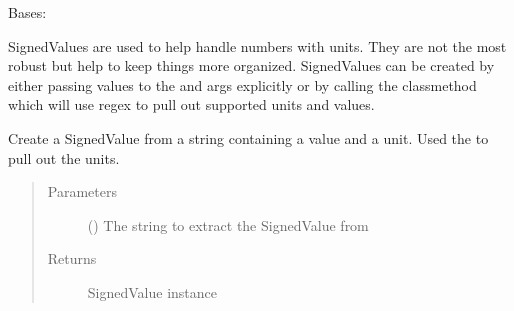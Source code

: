 \documentclass[letterpaper,10pt,english]{sphinxmanual}
\begin{document}
\begin{fulllineitems}
\label{\detokenize{polo.crystallography:polo.crystallography.cocktail.SignedValue}}
Bases: 

SignedValues are used to help handle numbers with units. They
are not the most robust but help to keep things more organized.
SignedValues can be created by either passing values to the
 and  args explicitly or by calling the classmethod
 which will use regex to pull out supported units and
values.

\begin{fulllineitems}
\label{\detokenize{polo.crystallography:polo.crystallography.cocktail.SignedValue.make_from_string}}
Create a SignedValue from a string containing a value and a unit.
Used the  to pull out the units.

\begin{sphinxVerbatim}[commandchars=\\\{\}]
    
  
\end{sphinxVerbatim}
\begin{quote}\begin{description}
\item[{Parameters}] \leavevmode
{} () \textendash{} The string to extract the SignedValue from

\item[{Returns}] \leavevmode
SignedValue instance


\end{description}
\end{quote}
\end{fulllineitems}
\end{fulllineitems}
\end{document}

